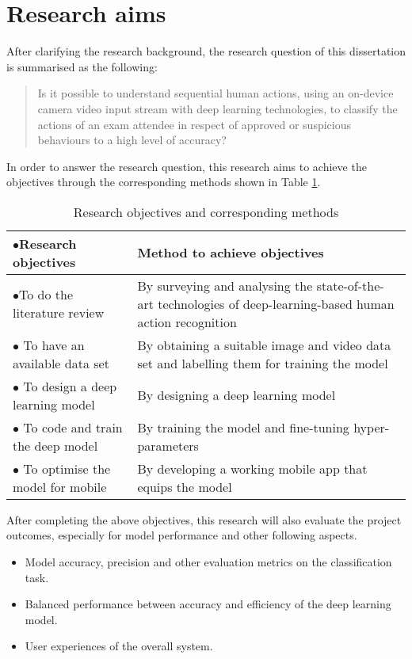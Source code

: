 \section{Research aims}
\label{sec:Research aims}
After clarifying the research background, the research question of this dissertation is summarised as the following:

\begin{quote}
    Is it possible to understand sequential human actions, using an on-device camera video input stream with deep learning technologies, to classify the actions of an exam attendee in respect of approved or suspicious behaviours to a high level of accuracy?
\end{quote}

In order to answer the research question, this research aims to achieve the objectives through the corresponding methods shown in Table \ref{tab:Research objectives}.

\begin{table}[!ht]
    \centering
    \begin{longtable}{>{\hspace*{-0.3cm}$\bullet$\hspace*{0.2cm}}p{}p{}}
\textbf{Research objectives} & \textbf{Method to achieve objectives} \\ \hline
To do the literature review & By surveying and analysing the state-of-the-art technologies of deep-learning-based human action recognition \\ \hline
To have an available data set & By obtaining a suitable image and video data set and labelling them for training the model \\ \hline
To design a deep learning model & By designing a deep learning model \\ \hline
To code and train the deep model & By training the model and fine-tuning hyper-parameters \\ \hline
To optimise the model for mobile & By developing a working mobile app that equips the model \\ 
\end{longtable}
    \caption{Research objectives and corresponding methods}
    \label{tab:Research objectives}
\end{table}

After completing the above objectives, this research will also evaluate the project outcomes, especially for model performance and other following aspects.

\begin{itemize}
    \item Model accuracy, precision and other evaluation metrics on the classification task.
    \item Balanced performance between accuracy and efficiency of the deep learning model.
    \item User experiences of the overall system.
\end{itemize}
